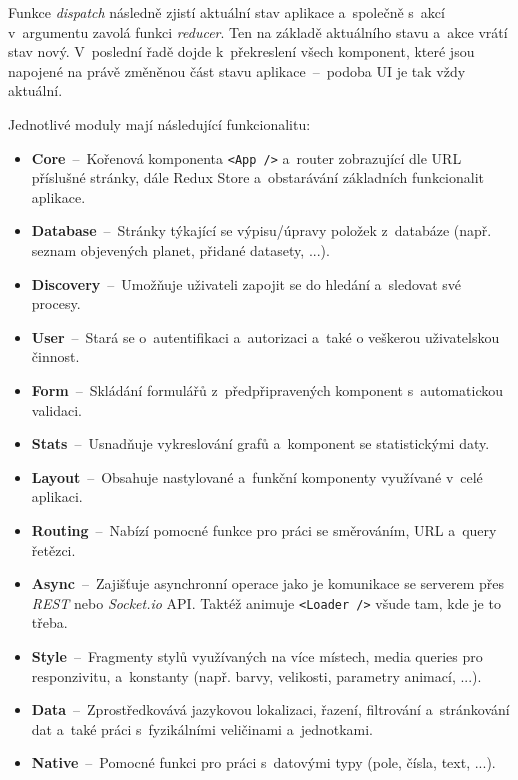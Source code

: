 \documentclass[a4paper,12pt]{article}
\def\code#1{\texttt{#1}}
\begin{document}
{{{{{{{{

Funkce \textit{dispatch} následně zjistí aktuální stav aplikace a~společně s~akcí v~argumentu zavolá funkci \textit{reducer}. Ten na základě aktuálního stavu a~akce vrátí stav nový. V~poslední řadě dojde k~překreslení všech komponent, které jsou napojené na právě změněnou část stavu aplikace~--~podoba UI je tak vždy aktuální.

\newpage



Jednotlivé moduly mají následující funkcionalitu:

\begin{itemize}
\item \textbf{Core}~--~Kořenová komponenta \code{<App />} a~router zobrazující dle URL příslušné stránky, dále Redux Store a~obstarávání základních funkcionalit aplikace.
\item \textbf{Database}~--~Stránky týkající se výpisu/úpravy položek z~databáze (např. seznam objevených planet, přidané datasety, ...).
\item \textbf{Discovery}~--~Umožňuje uživateli zapojit se do hledání a~sledovat své procesy.
\item \textbf{User}~--~Stará se o~autentifikaci a~autorizaci a~také o veškerou uživatelskou činnost.
\item \textbf{Form}~--~Skládání formulářů z~předpřipravených komponent s~automatickou validaci.
\item \textbf{Stats}~--~Usnadňuje vykreslování grafů a~komponent se statistickými daty.
\item \textbf{Layout}~--~Obsahuje nastylované a~funkční komponenty využívané v~celé aplikaci.
\item \textbf{Routing}~--~Nabízí pomocné funkce pro práci se směrováním, URL a~query řetězci.
\item \textbf{Async}~--~Zajišťuje asynchronní operace jako je komunikace se serverem přes \textit{REST} nebo \textit{Socket.io} API. Taktéž animuje \code{<Loader />} všude tam, kde je to třeba.
\item \textbf{Style}~--~Fragmenty stylů využívaných na více místech, media queries pro responzivitu, a~konstanty (např. barvy, velikosti, parametry animací, ...).
\item \textbf{Data}~--~Zprostředkovává jazykovou lokalizaci, řazení, filtrování a~stránkování dat a~také práci s~fyzikálními veličinami a~jednotkami.
\item \textbf{Native}~--~Pomocné funkci pro práci s~datovými typy (pole, čísla, text, ...).
\end{itemize}

}}}}}}}}
\end{document}
